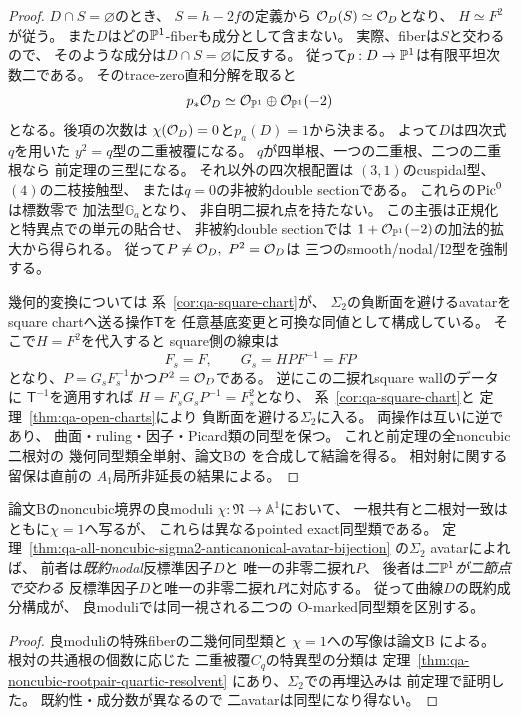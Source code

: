\begin{proof}
$D\cap S=\varnothing$のとき、
$S=h-2f$の定義から
$\mathcal O_D(S)\simeq\mathcal O_D$となり、
$H\simeq F^2$が従う。
また$D$はどの$\mathbb P^1$-fiberも成分として含まない。
実際、fiberは$S$と交わるので、
そのような成分は$D\cap S=\varnothing$に反する。
従って$p:D\to\mathbb P^1$は有限平坦次数二である。
そのtrace-zero直和分解を取ると
\[
 p_*\mathcal O_D\simeq\mathcal O_{\mathbb P^1}\oplus
                \mathcal O_{\mathbb P^1}(-2)
\]
となる。後項の次数は
$\chi(\mathcal O_D)=0$と$p_a(D)=1$から決まる。
よって$D$は四次式$q$を用いた
$y^2=q$型の二重被覆になる。
$q$が四単根、一つの二重根、二つの二重根なら
前定理の三型になる。
それ以外の四次根配置は
$(3,1)$のcuspidal型、
$(4)$の二枝接触型、
または$q=0$の非被約double sectionである。
これらの$\operatorname{Pic}^0$は標数零で
加法型$\mathbb G_a$となり、
非自明二捩れ点を持たない。
この主張は正規化と特異点での単元の貼合せ、
非被約double sectionでは
$1+\mathcal O_{\mathbb P^1}(-2)$の加法的拡大から得られる。
従って$P\ne\mathcal O_D,\ P^2=\mathcal O_D$は
三つのsmooth/nodal/I2型を強制する。

幾何的変換については
系~\ref{cor:qa-square-chart}が、
$\Sigma_2$の負断面を避けるavatarを
square chartへ送る操作$\mathsf T$を
任意基底変更と可換な同値として構成している。
そこで$H=F^2$を代入すると
square側の線束は
\[
 F_s=F,\qquad G_s=HPF^{-1}=FP
\]
となり、$P=G_sF_s^{-1}$かつ$P^2=\mathcal O_D$である。
逆にこの二捩れsquare wallのデータに
$\mathsf T^{-1}$を適用すれば
$H=F_sG_sP^{-1}=F_s^2$となり、
系~\ref{cor:qa-square-chart}と
定理~\ref{thm:qa-open-charts}により
負断面を避ける$\Sigma_2$に入る。
両操作は互いに逆であり、
曲面・ruling・因子・Picard類の同型を保つ。
これと前定理の全noncubic二根対の
幾何同型類全単射、論文Bの
\cite[\texttt{thm:noncubic-intrinsic-presentation-equivalence}]{QuadricModuli2026}
を合成して結論を得る。
相対射に関する留保は直前の
$A_1$局所非延長の結果による。
\end{proof}

\begin{corollary}
\label{cor:qa-sigma2-avatar-separates-special-noncubic-classes}
論文Bのnoncubic境界の良moduli
$\chi:\mathfrak N\to\mathbb A^1$において、
一根共有と二根対一致はともに$\chi=1$へ写るが、
これらは異なるpointed exact同型類である。
定理~\ref{thm:qa-all-noncubic-sigma2-anticanonical-avatar-bijection}
の$\Sigma_2$ avatarによれば、
前者は\emph{既約nodal}反標準因子$D$と
唯一の非零二捩れ$P$、
後者は\emph{二$\mathbb P^1$が二節点で交わる}
反標準因子$D$と唯一の非零二捩れ$P$に対応する。
従って曲線$D$の既約成分構成が、
良moduliでは同一視される二つの
O-marked同型類を区別する。
\end{corollary}
\begin{proof}
良moduliの特殊fiberの二幾何同型類と
$\chi=1$への写像は論文B
\cite[\texttt{prop:noncubic-good-moduli-fibers}]{QuadricModuli2026}
による。
根対の共通根の個数に応じた
二重被覆$C_q$の特異型の分類は
定理~\ref{thm:qa-noncubic-rootpair-quartic-resolvent}
にあり、$\Sigma_2$での再埋込みは
前定理で証明した。
既約性・成分数が異なるので
二avatarは同型になり得ない。
\end{proof}

